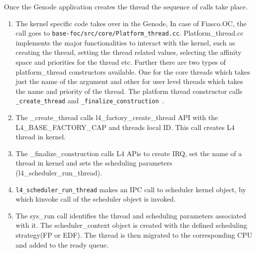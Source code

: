 Once the Genode application creates the thread the sequence of calls take place.

\begin{enumerate}
\item The kernel specific code takes over in the Genode, In case of Fiasco.OC, the call goes to \texttt{base-foc/src/core/Platform\_thread.cc}. Platform\_thread.cc implements the major functionalities to interact with the kernel, such as creating the thread, setting the thread related values, selecting the affinity space and priorities for the thread etc. Further there are two types of platform\_thread constructors available. One for the core threads which takes just the name of the argument and other for user level threads which takes the name and priority of the thread.  The platform thread constructor calls \texttt{\_create\_thread} and \texttt{\_finalize\_construction }.

\item The \_create\_thread calls l4\_factory\_create\_thread API with the L4\_BASE\_FACTORY\_CAP and threads local ID. This call creates L4 thread in kernel. 

\item The \_finalize\_construction calls L4 APis to create IRQ, set the name of a thread in kernel and sets the scheduling parameters (l4\_scheduler\_run\_thread).

\item \texttt{l4\_scheduler\_run\_thread} makes an IPC call to scheduler kernel object, by which kinvoke call of the scheduler object is invoked.

\item The sys\_run call identifies the thread and scheduling parameters associated with it. The scheduler\_context object is created with the defined scheduling strategy(FP or EDF). The thread is then migrated to the corresponding CPU and added to the ready queue.  
\end{enumerate}
